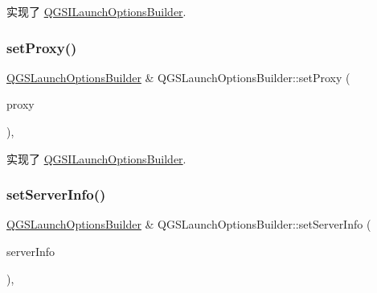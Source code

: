 实现了 \mbox{\hyperlink{class_q_g_s_i_launch_options_builder_a5e1555d99d7bb16da007dd9e2fd88e9a}{Q\+G\+S\+I\+Launch\+Options\+Builder}}.

\mbox{\label{class_q_g_s_launch_options_builder_a28a1a465e5e8f22cf34151ee29b33a64}} 
\subsubsection{\texorpdfstring{set\+Proxy()}{setProxy()}}
{\footnotesize\ttfamily \mbox{\hyperlink{class_q_g_s_launch_options_builder}{Q\+G\+S\+Launch\+Options\+Builder}} \& Q\+G\+S\+Launch\+Options\+Builder\+::set\+Proxy (\begin{DoxyParamCaption}\item[{const Q\+Network\+Proxy \&}]{proxy }\end{DoxyParamCaption})\hspace{0.3cm}{\ttfamily [override]}, {\ttfamily [virtual]}}



实现了 \mbox{\hyperlink{class_q_g_s_i_launch_options_builder_a73c506f75e24bc57493e8c7dbcc4c4d2}{Q\+G\+S\+I\+Launch\+Options\+Builder}}.

\mbox{\label{class_q_g_s_launch_options_builder_a3403f2bb452763be236c8dd21bcb6f4c}} 
\subsubsection{\texorpdfstring{set\+Server\+Info()}{setServerInfo()}}
{\footnotesize\ttfamily \mbox{\hyperlink{class_q_g_s_launch_options_builder}{Q\+G\+S\+Launch\+Options\+Builder}} \& Q\+G\+S\+Launch\+Options\+Builder\+::set\+Server\+Info (\begin{DoxyParamCaption}\item[{const \mbox{\hyperlink{class_q_g_s_server_info}{Q\+G\+S\+Server\+Info}} \&}]{server\+Info }\end{DoxyParamCaption})\hspace{0.3cm}{\ttfamily [override]}, {\ttfamily [virtual]}}



